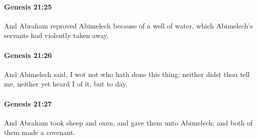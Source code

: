 		\paragraph{Genesis 21:25} %
			\label{GENESIS-21-25}

			And Abraham reproved Abimelech because of a well of water, which Abimelech's servants had violently taken away.


		\paragraph{Genesis 21:26} %
			\label{GENESIS-21-26}

			And Abimelech said, I wot not who hath done this thing: neither didst thou tell me, neither yet heard I of it, but to day.


		\paragraph{Genesis 21:27} %
			\label{GENESIS-21-27}

			And Abraham took sheep and oxen, and gave them unto Abimelech; and both of them made a covenant.


